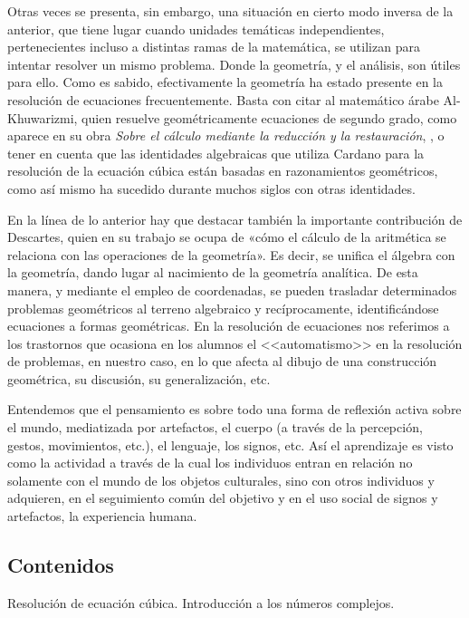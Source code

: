 Otras veces se presenta, sin embargo, una situación en cierto modo inversa de la anterior, que tiene lugar cuando unidades temáticas independientes, pertenecientes incluso a distintas ramas de la matemática, se utilizan para intentar resolver un mismo problema. Donde la geometría, y el análisis, son útiles para ello. Como es sabido, efectivamente la geometría ha estado presente en la resolución de ecuaciones frecuentemente. Basta con citar al matemático árabe Al-Khuwarizmi, quien resuelve geométricamente ecuaciones de segundo grado, como aparece en su obra \textit{Sobre el cálculo mediante la reducción y la restauración}, \textcite{boyer1986}, o tener en cuenta que las identidades algebraicas que utiliza Cardano para la resolución de la ecuación cúbica están basadas en razonamientos geométricos, como así mismo ha sucedido durante muchos siglos con otras identidades. 

En la línea de lo anterior hay que destacar también la importante contribución de Descartes, quien en su trabajo se ocupa de «cómo el cálculo de la aritmética se relaciona con las operaciones de la geometría». Es decir, se unifica el álgebra con la geometría, dando lugar al nacimiento de la geometría analítica. De esta manera, y mediante el empleo de coordenadas, se pueden trasladar determinados problemas geométricos al terreno algebraico y recíprocamente, identificándose ecuaciones a formas geométricas. En la resolución de ecuaciones nos referimos a los trastornos que ocasiona en los alumnos el <<automatismo>> en la resolución de problemas, en nuestro caso, en lo que afecta al dibujo de una construcción geométrica, su discusión, su generalización, etc. 

Entendemos que el pensamiento es sobre todo una forma de reflexión activa sobre el mundo, mediatizada por artefactos, el cuerpo (a través de la percepción, gestos, movimientos, etc.), el lenguaje, los signos, etc. Así el aprendizaje es visto como la actividad a través de la cual los individuos entran en relación no solamente con el mundo de los objetos culturales, sino con otros individuos y adquieren, en el seguimiento común del objetivo y en el uso social de signos y artefactos, la experiencia humana.

\subsection{Contenidos}

Resolución de ecuación cúbica. Introducción a los números complejos. 

